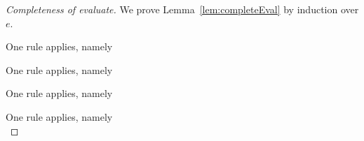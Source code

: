 \begin{proof}[Completeness of evaluate]
  We prove Lemma~\ref{lem:completeEval} by induction over $e$.

    {One rule applies, namely \\
    }

    {One rule applies, namely \\
    }

  {
    One rule applies, namely \\
    }

  { One rule applies, namely \\
    }


\end{proof}
